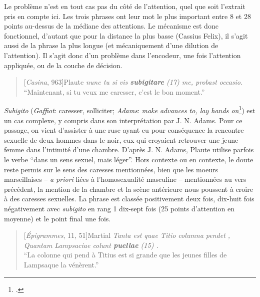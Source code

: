 Le problème n'est en tout cas pas du côté de l'attention, quel que soit l'extrait pris en compte ici. Les trois phrases ont leur mot le plus important entre 8 et 28 points au-dessus de la médiane des attentions. Le mécanisme est donc fonctionnel, d'autant que pour la distance la plus basse (Cassius Felix), il s'agit aussi de la phrase la plus longue (et mécaniquement d'une dilution de l'attention). Il s'agit donc d'un problème dans l'encodeur, une fois l'attention appliquée, ou de la couche de décision.


\begin{quote}[\textit{Casina}, 963]{Plaute}
    \textit{nunc tu si vis \textbf{subigitare} (17) me, probast occasio.} \\
    \enquote{Maintenant, si tu veux me caresser, c'est le bon moment.}
\end{quote}

\textit{Subigito} (\textit{Gaffiot}: caresser, solliciter; \textit{Adams}: \textit{make advances to, lay hands on}\footcite[p. 323]{adams_prostitute}) est un cas complexe, y compris dans son interprétation par J. N. Adams. Pour ce passage, on vient d'assister à une ruse ayant eu pour conséquence la rencontre sexuelle de deux hommes dans le noir, eux qui croyaient retrouver une jeune femme dans l'intimité d'une chambre. D'après J. N. Adams, Plaute utilise parfois le verbe ``dans un sens sexuel, mais léger''. Hors contexte ou en contexte, le doute reste permis sur le sens des caresses mentionnées, bien que les moeurs marseillaises -- \textit{a priori} liées à l'homosexualité masculine -- mentionnées au vers précédent, la mention de la chambre et la scène antérieure nous poussent à croire à des caresses sexuelles. La phrase est classée positivement deux fois, dix-huit fois négativement avec \textit{subigito} en rang 1 dix-sept fois (25 points d'attention en moyenne) et le point final une fois.


% 
\begin{quote}[\textit{Épigrammes}, 11, 51]{Martial}
\textit{Tanta est quae Titio columna pendet , Quantam Lampsaciae colunt \textbf{puellae} (15) .}\\
\enquote{La colonne qui pend à Titius est si grande que les jeunes filles de Lampsaque la vénèrent.}
\end{quote}

